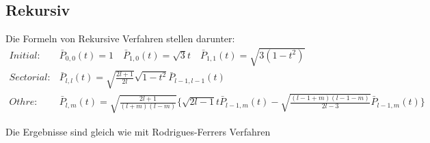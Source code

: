 \documentclass[12pt]{article}
\begin{document}
\subsection{Rekursiv}
Die Formeln von Rekursive Verfahren stellen darunter:
\begin{align*}
Initial: & \bar{P}_{0,0}(t) = 1\quad \bar{P}_{1,0}(t) = \sqrt{3}t\quad \bar{P}_{1,1}(t) = \sqrt{3(1-t^2)}\\
Sectorial: & \bar{P}_{l,l}(t) = \sqrt{\frac{2l+1}{2l}} \sqrt{1-t^2}\bar{P}_{l-1,l-1}(t) \\
Othre: & \bar{P}_{l,m}(t) = \sqrt{\frac{2l+1}{(l+m)(l-m)}} \{\sqrt{2l-1} t \bar{P}_{l-1,m}(t) - \sqrt{\frac{(l-1+m)(l-1-m)}{2l-3}} \bar{P}_{l-1,m}(t)\}
\end{align*}
\begin{figure}[ht]\centering
\end{figure}
\newline
Die Ergebnisse sind gleich wie mit Rodrigues-Ferrers Verfahren \newpage
\end{document}
